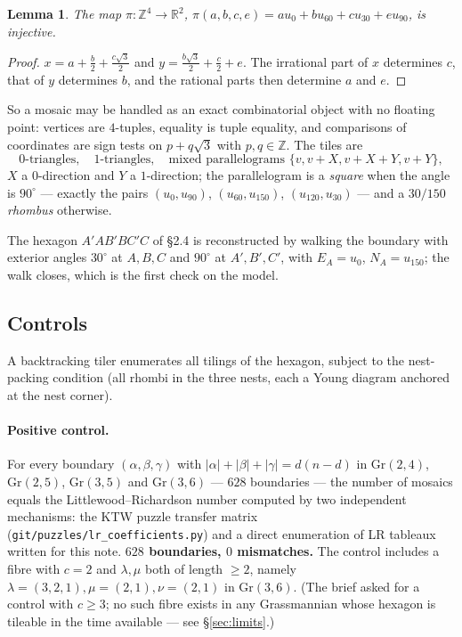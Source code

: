 \documentclass[11pt]{article}
\theoremstyle{plain}
\newtheorem{lemma}[theorem]{Lemma}
\theoremstyle{definition}
\newcommand{\Z}{\mathbb{Z}}
\begin{document}
\begin{lemma}\label{lem:inj}
The map $\pi:\Z^4\to\mathbb{R}^2$, $\pi(a,b,c,e)=a u_0+b u_{60}+c u_{30}+e u_{90}$,
is injective.
\end{lemma}
\begin{proof}
$x=a+\tfrac b2+\tfrac{c\sqrt3}{2}$ and $y=\tfrac{b\sqrt3}{2}+\tfrac c2+e$.  The
irrational part of $x$ determines $c$, that of $y$ determines $b$, and the rational
parts then determine $a$ and $e$.
\end{proof}

So a mosaic may be handled as an exact combinatorial object with no floating point:
vertices are $4$-tuples, equality is tuple equality, and comparisons of coordinates
are sign tests on $p+q\sqrt3$ with $p,q\in\Z$.  The tiles are
\[
 \text{$0$-triangles},\quad\text{$1$-triangles},\quad
 \text{mixed parallelograms } \{v,v{+}X,v{+}X{+}Y,v{+}Y\},
\]
$X$ a $0$-direction and $Y$ a $1$-direction; the parallelogram is a \emph{square}
when the angle is $90^\circ$ --- exactly the pairs $(u_0,u_{90})$, $(u_{60},u_{150})$,
$(u_{120},u_{30})$ --- and a $30/150$ \emph{rhombus} otherwise.

The hexagon $A'AB'BC'C$ of \S2.4 is reconstructed by walking the boundary with
exterior angles $30^\circ$ at $A,B,C$ and $90^\circ$ at $A',B',C'$, with
$E_A=u_0$, $N_A=u_{150}$; the walk closes, which is the first check on the model.

\subsection{Controls}

A backtracking tiler enumerates all tilings of the hexagon, subject to the
nest-packing condition (all rhombi in the three nests, each a Young diagram
anchored at the nest corner).

\paragraph{Positive control.}  For every boundary $(\alpha,\beta,\gamma)$ with
$|\alpha|+|\beta|+|\gamma|=d(n-d)$ in $\mathrm{Gr}(2,4)$, $\mathrm{Gr}(2,5)$,
$\mathrm{Gr}(3,5)$ and $\mathrm{Gr}(3,6)$ --- $628$ boundaries --- the number of
mosaics equals the Littlewood--Richardson number computed by two independent
mechanisms: the KTW puzzle transfer matrix (\texttt{git/puzzles/lr\_coefficients.py})
and a direct enumeration of LR tableaux written for this note.
\textbf{$628$ boundaries, $0$ mismatches.}  The control includes a fibre with
$c=2$ and $\lambda,\mu$ both of length $\ge 2$, namely
$\lambda=(3,2,1),\mu=(2,1),\nu=(2,1)$ in $\mathrm{Gr}(3,6)$.  (The brief asked for a
control with $c\ge 3$; no such fibre exists in any Grassmannian whose hexagon is
tileable in the time available --- see \S\ref{sec:limits}.)
\end{document}
